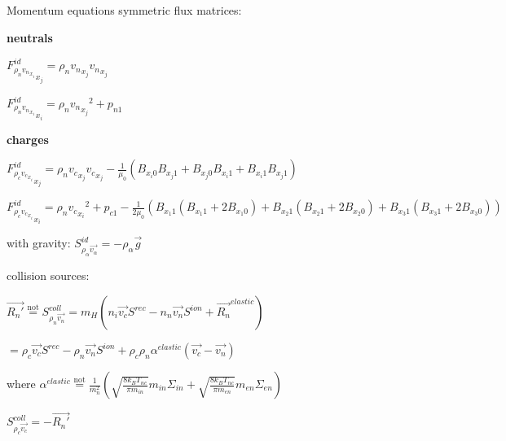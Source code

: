 \documentclass{beamer}
\begin{document}
\begin{frame}{Momentum equations}
symmetric flux matrices:

\textbf{neutrals}

${F_{\rho_{n}{v_n}_{x_i}}^{id}}_{x_j} = \rho_n {v_n}_{x_j} {v_n}_{x_j}  $ 

${F_{\rho_{n}{v_n}_{x_i}}^{id}}_{x_i} = \rho_n {{v_n}_{x_j}}^2 + p_{n1}  $

\textbf{charges}
 
${F_{\rho_{c}{v_c}_{x_i}}^{id}}_{x_j} = \rho_n {v_c}_{x_j} {v_c}_{x_j} - \frac{1}{\mu_0}(B_{x_i 0}B_{x_j 1} + B_{x_j0}B_{x_i1}  + B_{x_i1}B_{x_j1}  ) $ 

${F_{\rho_{c}{v_c}_{x_i}}^{id}}_{x_i} = \rho_n {{v_c}_{x_i}}^2 + p_{c1}  - \frac{1}{2 \mu_0}(B_{x_1 1} (B_{x_1 1} + 2  B_{x_1 0} )+ B_{x_2 1} (B_{x_2 1} + 2  B_{x_2 0} ) + B_{x_3 1} (B_{x_3 1} + 2  B_{x_3 0} ))$

with gravity: $S_{\rho_\alpha \vec{v_\alpha}}^{id} = -\rho_\alpha \vec{g}$

collision sources:

$\vec{R_n'} \stackrel{\text{not}}{=} S_{\rho_n \vec{v_n}}^{coll} =  m_H(n_i \vec{v_c} S^{rec} - n_n \vec{v_n} S^{ion} +\vec{R_n}^{elastic})$

$=\rho_c \vec{v_c} S^{rec} - \rho_n \vec{v_n} S^{ion} +\rho_c \rho_n \alpha^{elastic} (\vec{v_c} - \vec{v_n})$

where $\alpha^{elastic}\stackrel{\text{not}}{=} \frac{1}{m_n^2}(\sqrt{\frac{8 k_B T_{nc}}{\pi m_{in}}} m_{in} \Sigma_{in} +  \sqrt{\frac{8 k_B T_{nc}}{\pi m_{en}}} m_{en} \Sigma_{en})$ 


$S_{\rho_c \vec{v_c}}^{coll} =  -\vec{R_n'} $ 


\end{frame}
\end{document}
